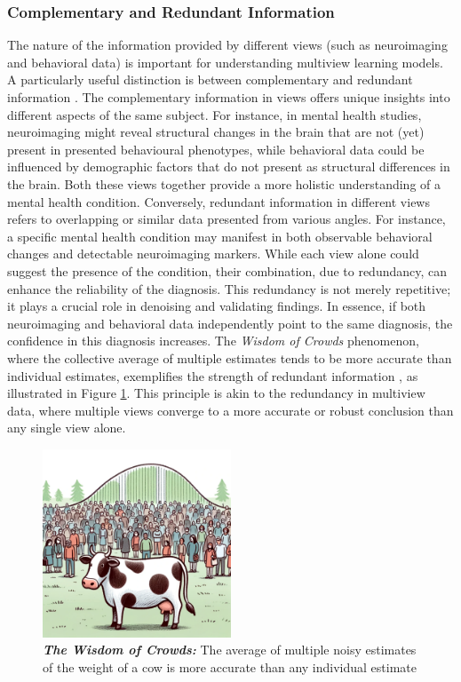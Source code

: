 \subsubsection{Complementary and Redundant Information}
The nature of the information provided by different \gls{views} (such as neuroimaging and behavioral data) is important for understanding multiview learning models.
A particularly useful distinction is between complementary and redundant information \citep{nguyen2020multiview,lyu2021understanding, chen2022representation}.
The complementary information in \gls{views} offers unique insights into different aspects of the same subject. For instance, in mental health studies, neuroimaging might reveal structural changes in the brain that are not (yet) present in presented behavioural phenotypes, while behavioral data could be influenced by demographic factors that do not present as structural differences in the brain. Both these \gls{views} together provide a more holistic understanding of a mental health condition.
Conversely, redundant information in different \gls{views} refers to overlapping or similar data presented from various angles. For instance, a specific mental health condition may manifest in both observable behavioral changes and detectable neuroimaging markers. While each view alone could suggest the presence of the condition, their combination, due to redundancy, can enhance the reliability of the diagnosis. This redundancy is not merely repetitive; it plays a crucial role in denoising and validating findings. In essence, if both neuroimaging and behavioral data independently point to the same diagnosis, the confidence in this diagnosis increases.
The \textit{Wisdom of Crowds} phenomenon, where the collective average of multiple estimates tends to be more accurate than individual estimates, exemplifies the strength of redundant information \citep{galton1907vox}, as illustrated in Figure \ref{fig:wisdomofcrowds}. This principle is akin to the redundancy in multiview data, where multiple \gls{views} converge to a more accurate or robust conclusion than any single view alone.

\begin{figure}
    \centering
    \includegraphics[width=0.5\textwidth]{figures/cow.png}
    \caption[The Wisdom of Crowds]{\textit{\textbf{The Wisdom of Crowds:}} The average of multiple noisy estimates of the weight of a cow is more accurate than any individual estimate}\label{fig:wisdomofcrowds}
\end{figure}

